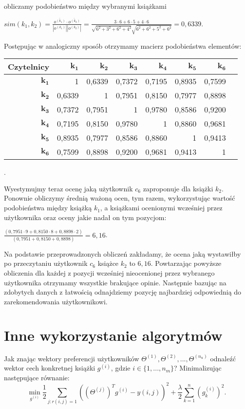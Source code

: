 \documentclass[12pt,a4paper]{report}
\begin{document}
obliczamy podobieństwo między wybranymi książkami
\begin{center}
$sim(k_1,k_2) = \frac{\overline{o^{(k_1)}} \cdot \overline{o^{(k_2)}}}{|o^{(k_1)}||o^{(k_2)}|} = \frac{3 \cdot 6 + 6 \cdot 5 + 4 \cdot 6}{\sqrt{6^2 + 3^2 + 6^2 + 4^2} \sqrt{6^2 + 6^2 + 5^2 + 6^2}} = 0,6339$.
\end{center}
Postępując w analogiczny sposób otrzymamy macierz podobieństwa elementów:
\begin{center}
\begin{tabular}{|r|r|r|r|r|r|r|r|} \hline
\textbf{Czytelnicy} & $\mathbf{k_1}$ & $\mathbf{k_2}$ & $\mathbf{k_3}$ & $\mathbf{k_4}$ & $\mathbf{k_5}$ & $\mathbf{k_6}$ \\
\hline
$\mathbf{k_1}$ & 1 & 0,6339 & 0,7372 & 0,7195 & 0,8935 & 0,7599 \\
\hline
$\mathbf{k_2}$ & 0,6339 & 1 & 0,7951 & 0,8150 & 0,7977 & 0,8898 \\
\hline
$\mathbf{k_3}$ & 0,7372 & 0,7951 & 1 & 0,9780 & 0,8586 & 0,9200 \\
\hline
$\mathbf{k_4}$ & 0,7195 & 0,8150 & 0,9780 & 1 & 0,8860 & 0,9681 \\
\hline 
$\mathbf{k_5}$ & 0,8935 & 0,7977 & 0,8586 & 0,8860 & 1 & 0,9413 \\
\hline 
$\mathbf{k_6}$ & 0,7599 & 0,8898 & 0,9200 & 0,9681 & 0,9413 & 1 \\
\hline 
\end{tabular}.
\end{center}
Wyestymujmy teraz ocenę jaką użytkownik $c_6$ zaproponuje dla książki $k_2$. Ponownie obliczymy średnią ważoną ocen, tym razem, wykorzystując wartość podobieństwa między książką $k_1$, a książkami ocenionymi wcześniej przez użytkownika oraz oceny jakie nadał on tym pozycjom:
\begin{center}
$\frac{(0,7951 \cdot 9 + 0,8150 \cdot 8 + 0,8898 \cdot 2)}{(0,7951 + 0,8150 + 0,8898)} = 6,16 $.
\end{center}
Na podstawie przeprowadzonych obliczeń zakładamy, że ocena jaką wystawiłby po przeczytaniu użytkownik $c_6$ książce $k_2$ to $6,16$.
Powtarzając powyższe obliczenia dla każdej z pozycji wcześniej nieocenionej przez wybranego użytkownika otrzymamy wszystkie brakujące opinie. Następnie bazując na zdobytych danych z łatwością odnajdziemy pozycję najbardziej odpowiednią do zarekomendowania użytkownikowi.

\section{Inne wykorzystanie algorytmów}
Jak znając wektory preferencji użytkowników $\Theta^{(1)}, \Theta^{(2)},...,\Theta^{(n_u)}$ odnaleźć wektor cech konkretnej książki $g^{(i)}$, gdzie $i \in \{1,...,n_m\}$?
Minimalizując następujące równanie:
$$\min \limits_{g^{(i)}} \frac{1}{2} \sum_{j:r(i,j)=1} ((\Theta^{(j)})^T g^{(i)} - y(i,j))^2 + \frac{\lambda}{2} \sum_{k=1}^n (g_k^{(i)})^2.$$
\end{document}
